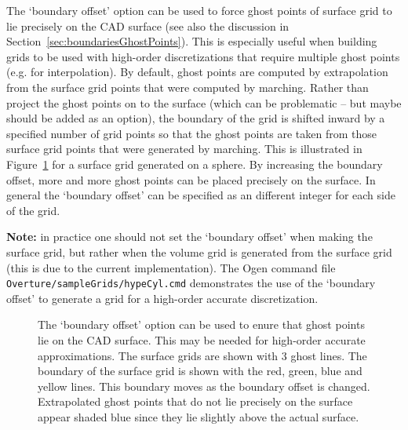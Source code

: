 The `boundary offset' option can be used to force ghost points of surface grid 
to lie precisely on the CAD surface (see also the discussion in Section~\ref{sec:boundariesGhostPoints}). 
This is especially useful when building grids to be used with
high-order discretizations that require multiple ghost points (e.g. for interpolation).
By default, ghost points are computed by extrapolation from 
the surface grid points that were computed by marching. Rather than project the ghost points on to
the surface (which can be problematic -- but maybe should be added as an option), the boundary
of the grid is shifted inward by a specified number of grid points 
so that the ghost points are taken from those surface grid points that were generated by marching.
This is illustrated in Figure~\ref{fig:boundaryOffset} for a surface grid generated on a sphere.
By increasing the boundary offset, more and more ghost points can be placed precisely on the
surface. In general the `boundary offset' can be specified as an different integer for each side of the grid. 

{\bf Note:} in practice one should not set the `boundary offset' when making the surface grid, but rather when the
       volume grid is generated from the surface grid (this is due to the current implementation). 
    The Ogen command file {\tt Overture/sampleGrids/hypeCyl.cmd} demonstrates the use of the `boundary offset'
   to generate a grid for a high-order accurate discretization.

{
\newcommand{\figWidthd}{7.5cm}
\newcommand{\trimfig}[2]{\trimPlot{#1}{#2}{.0}{.0}{.0}{.025}}
\begin{figure}[hbt]
\begin{center}
\end{center}
\caption{The `boundary offset' option can be used to enure that ghost points lie on the CAD surface. This may be needed for high-order
     accurate approximations.
   The surface grids are shown with 3 ghost lines. The boundary of the surface grid is shown with the 
          red, green, blue and yellow lines. This boundary moves as the boundary offset is changed.
          Extrapolated ghost points that do not lie precisely on the surface
          appear shaded blue since they lie slightly above the actual surface.  } \label{fig:boundaryOffset}
\end{figure}
}



